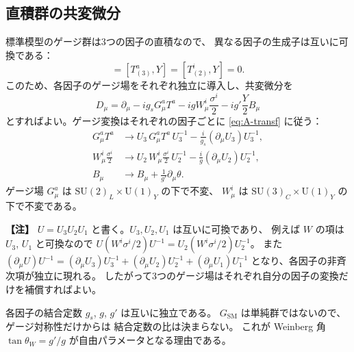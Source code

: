 \documentclass[uplatex,dvipdfmx,a4paper,11pt,openany]{jsbook}
\newenvironment{note}{\vspace{1ex}\par\footnotesize\noindent\textbf{【注】}}{\par\vspace{1ex}}
\numberwithin{equation}{chapter}
\theoremstyle{definition}
\theoremstyle{plain}
\theoremstyle{remark}
\newcommand{\SM}{\mathrm{SM}}
\newcommand{\SU}{\mathrm{SU}}
\newcommand{\U}{\mathrm{U}}
\begin{document}
\subsection{直積群の共変微分}
標準模型のゲージ群は3つの因子の直積なので、
異なる因子の生成子は互いに可換である：
\begin{equation}
[T^a_{(3)},T^i_{(2)}]=[T^a_{(3)},Y]=[T^i_{(2)},Y]=0 .
\end{equation}
このため、各因子のゲージ場をそれぞれ独立に導入し、共変微分を
\begin{equation}
\boxed{
D_\mu
=
\partial_\mu
-ig_sG_\mu^aT^a
-igW_\mu^i\frac{\sigma^i}{2}
-ig'\frac{Y}{2}B_\mu
}
\label{eq:SM-covariant-derivative}
\end{equation}
とすればよい。ゲージ変換はそれぞれの因子ごとに \eqref{eq:A-transf} に従う：
\begin{align}
G_\mu^aT^a&\longrightarrow U_3\,G_\mu^aT^a\,U_3^{-1}-\frac{i}{g_s}(\partial_\mu U_3)U_3^{-1},\\
W_\mu^i\frac{\sigma^i}{2}&\longrightarrow U_2\,W_\mu^i\frac{\sigma^i}{2}\,U_2^{-1}-\frac{i}{g}(\partial_\mu U_2)U_2^{-1},\\
B_\mu&\longrightarrow B_\mu+\frac{1}{g'}\partial_\mu\theta .
\end{align}
ゲージ場 $G_\mu^a$ は $\SU(2)_L\times\U(1)_Y$ の下で不変、
$W_\mu^i$ は $\SU(3)_C\times\U(1)_Y$ の下で不変である。
\begin{note}
$U=U_3U_2U_1$ と書く。$U_3,U_2,U_1$ は互いに可換であり、
例えば $W$ の項は $U_3$, $U_1$ と可換なので
$U(W^i\sigma^i/2)U^{-1}=U_2(W^i\sigma^i/2)U_2^{-1}$。
また $(\partial_\mu U)U^{-1}=(\partial_\mu U_3)U_3^{-1}+(\partial_\mu U_2)U_2^{-1}+(\partial_\mu U_1)U_1^{-1}$
となり、各因子の非斉次項が独立に現れる。
したがって3つのゲージ場はそれぞれ自分の因子の変換だけを補償すればよい。
\end{note}
各因子の結合定数 $g_s$, $g$, $g'$ は互いに独立である。
$G_{\SM}$ は単純群ではないので、ゲージ対称性だけからは
結合定数の比は決まらない。
これが Weinberg 角 $\tan\theta_W=g'/g$ が自由パラメータとなる理由である。
\end{document}
